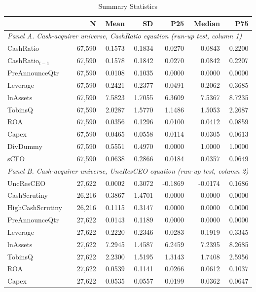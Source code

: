 \begin{table}[htbp]
\centering
\caption{Summary Statistics}
\label{tab:summary_stats}
\scriptsize
\begin{tabular}{lrrrrrr}
\toprule
 & N & Mean & SD & P25 & Median & P75 \\
\midrule
\multicolumn{7}{l}{\textit{Panel A. Cash-acquirer universe, CashRatio equation (run-up test, column 1)}} \\
\addlinespace
CashRatio & 67,590 & 0.1573 & 0.1834 & 0.0270 & 0.0843 & 0.2200 \\
CashRatio$_{t-1}$ & 67,590 & 0.1578 & 0.1842 & 0.0270 & 0.0842 & 0.2207 \\
PreAnnounceQtr & 67,590 & 0.0108 & 0.1035 & 0.0000 & 0.0000 & 0.0000 \\
Leverage & 67,590 & 0.2421 & 0.2377 & 0.0491 & 0.2062 & 0.3685 \\
lnAssets & 67,590 & 7.5823 & 1.7055 & 6.3609 & 7.5367 & 8.7235 \\
TobinsQ & 67,590 & 2.0287 & 1.5770 & 1.1486 & 1.5053 & 2.2687 \\
ROA & 67,590 & 0.0356 & 0.1296 & 0.0100 & 0.0412 & 0.0859 \\
Capex & 67,590 & 0.0465 & 0.0558 & 0.0114 & 0.0305 & 0.0613 \\
DivDummy & 67,590 & 0.5551 & 0.4970 & 0.0000 & 1.0000 & 1.0000 \\
sCFO & 67,590 & 0.0638 & 0.2866 & 0.0184 & 0.0357 & 0.0649 \\
\midrule
\multicolumn{7}{l}{\textit{Panel B. Cash-acquirer universe, UncResCEO equation (run-up test, column 2)}} \\
\addlinespace
UncResCEO & 27,622 & 0.0002 & 0.3072 & -0.1869 & -0.0174 & 0.1686 \\
CashScrutiny & 26,216 & 0.3867 & 1.4701 & 0.0000 & 0.0000 & 0.0000 \\
HighCashScrutiny & 26,216 & 0.1115 & 0.3147 & 0.0000 & 0.0000 & 0.0000 \\
PreAnnounceQtr & 27,622 & 0.0143 & 0.1189 & 0.0000 & 0.0000 & 0.0000 \\
Leverage & 27,622 & 0.2220 & 0.2346 & 0.0283 & 0.1919 & 0.3345 \\
lnAssets & 27,622 & 7.2945 & 1.4587 & 6.2459 & 7.2395 & 8.2685 \\
TobinsQ & 27,622 & 2.2300 & 1.5195 & 1.3143 & 1.7408 & 2.5956 \\
ROA & 27,622 & 0.0539 & 0.1141 & 0.0266 & 0.0612 & 0.1037 \\
Capex & 27,622 & 0.0535 & 0.0557 & 0.0199 & 0.0362 & 0.0647 \\

\end{tabular}
\end{table}
